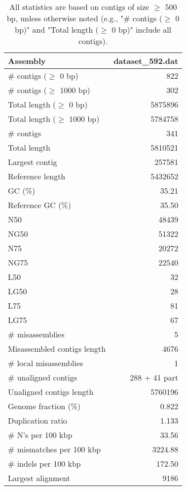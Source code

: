 \documentclass[12pt,a4paper]{article}
\begin{document}
\begin{table}[ht]
\begin{center}
\caption{All statistics are based on contigs of size $\geq$ 500 bp, unless otherwise noted (e.g., "\# contigs ($\geq$ 0 bp)" and "Total length ($\geq$ 0 bp)" include all contigs).}
\begin{tabular}{|l*{1}{|r}|}
\hline
Assembly & dataset\_592.dat \\ \hline
\# contigs ($\geq$ 0 bp) & 822 \\ \hline
\# contigs ($\geq$ 1000 bp) & 302 \\ \hline
Total length ($\geq$ 0 bp) & 5875896 \\ \hline
Total length ($\geq$ 1000 bp) & 5784758 \\ \hline
\# contigs & 341 \\ \hline
Total length & 5810521 \\ \hline
Largest contig & 257581 \\ \hline
Reference length & 5432652 \\ \hline
GC (\%) & 35.21 \\ \hline
Reference GC (\%) & 35.50 \\ \hline
N50 & 48439 \\ \hline
NG50 & 51322 \\ \hline
N75 & 20272 \\ \hline
NG75 & 22540 \\ \hline
L50 & 32 \\ \hline
LG50 & 28 \\ \hline
L75 & 81 \\ \hline
LG75 & 67 \\ \hline
\# misassemblies & 5 \\ \hline
Misassembled contigs length & 4676 \\ \hline
\# local misassemblies & 1 \\ \hline
\# unaligned contigs & 288 + 41 part \\ \hline
Unaligned contigs length & 5760196 \\ \hline
Genome fraction (\%) & 0.822 \\ \hline
Duplication ratio & 1.133 \\ \hline
\# N's per 100 kbp & 33.56 \\ \hline
\# mismatches per 100 kbp & 3224.88 \\ \hline
\# indels per 100 kbp & 172.50 \\ \hline
Largest alignment & 9186 \\ \hline
\end{tabular}
\end{center}
\end{table}
\end{document}
